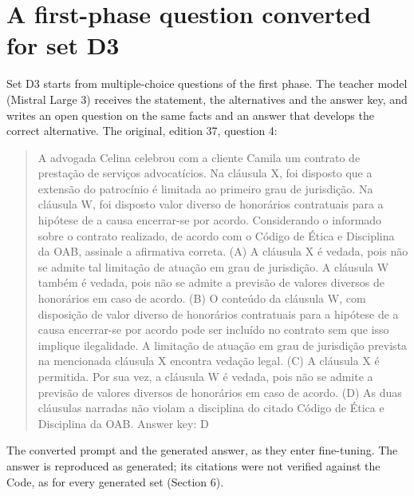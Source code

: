 \documentclass{IOS-Book-Article}
\begin{document}
\section{A first-phase question converted for set D3}
Set D3 starts from multiple-choice questions of the first phase. The teacher model (Mistral Large 3) receives the statement, the alternatives and the answer key, and writes an open question on the same facts and an answer that develops the correct alternative. The original, edition 37, question 4:
\begin{quote}\footnotesize\ttfamily\raggedright
A advogada Celina celebrou com a cliente Camila um contrato de prestação de serviços advocatícios. Na cláusula X, foi disposto que a extensão do patrocínio é limitada ao primeiro grau de jurisdição. Na cláusula W, foi disposto valor diverso de honorários contratuais para a hipótese de a causa encerrar-se por acordo. Considerando o informado sobre o contrato realizado, de acordo com o Código de Ética e Disciplina da OAB, assinale a afirmativa correta.\newline
(A) A cláusula X é vedada, pois não se admite tal limitação de atuação em grau de jurisdição. A cláusula W também é vedada, pois não se admite a previsão de valores diversos de honorários em caso de acordo.\newline
(B) O conteúdo da cláusula W, com disposição de valor diverso de honorários contratuais para a hipótese de a causa encerrar-se por acordo pode ser incluído no contrato sem que isso implique ilegalidade. A limitação de atuação em grau de jurisdição prevista na mencionada cláusula X encontra vedação legal.\newline
(C) A cláusula X é permitida. Por sua vez, a cláusula W é vedada, pois não se admite a previsão de valores diversos de honorários em caso de acordo.\newline
(D) As duas cláusulas narradas não violam a disciplina do citado Código de Ética e Disciplina da OAB.\newline
Answer key: D
\end{quote}
The converted prompt and the generated answer, as they enter fine-tuning. The answer is reproduced as generated; its citations were not verified against the Code, as for every generated set (Section 6).
\end{document}
